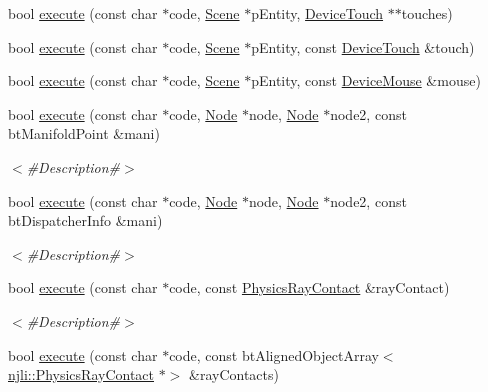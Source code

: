 \begin{DoxyCompactItemize}
\item 
bool \mbox{\hyperlink{classnjli_1_1_world_lua_virtual_machine_aae3f6a29e70b136722d01b316220bee8}{execute}} (const char $\ast$code, \mbox{\hyperlink{classnjli_1_1_scene}{Scene}} $\ast$p\+Entity, \mbox{\hyperlink{classnjli_1_1_device_touch}{Device\+Touch}} $\ast$$\ast$touches)
\item 
bool \mbox{\hyperlink{classnjli_1_1_world_lua_virtual_machine_a2ea566a1d2d4ad3c6b817e5e2d408b8f}{execute}} (const char $\ast$code, \mbox{\hyperlink{classnjli_1_1_scene}{Scene}} $\ast$p\+Entity, const \mbox{\hyperlink{classnjli_1_1_device_touch}{Device\+Touch}} \&touch)
\item 
bool \mbox{\hyperlink{classnjli_1_1_world_lua_virtual_machine_a30f05b73d451fc58e5e64263a4de58f7}{execute}} (const char $\ast$code, \mbox{\hyperlink{classnjli_1_1_scene}{Scene}} $\ast$p\+Entity, const \mbox{\hyperlink{classnjli_1_1_device_mouse}{Device\+Mouse}} \&mouse)
\item 
bool \mbox{\hyperlink{classnjli_1_1_world_lua_virtual_machine_a21227c3230633061ac2cc99a05c41e4e}{execute}} (const char $\ast$code, \mbox{\hyperlink{classnjli_1_1_node}{Node}} $\ast$node, \mbox{\hyperlink{classnjli_1_1_node}{Node}} $\ast$node2, const bt\+Manifold\+Point \&mani)
\begin{DoxyCompactList}\small\item\em $<$\#\+Description\#$>$ \end{DoxyCompactList}\item 
bool \mbox{\hyperlink{classnjli_1_1_world_lua_virtual_machine_a2b0155a6ae5dc65eea24fef0bac79821}{execute}} (const char $\ast$code, \mbox{\hyperlink{classnjli_1_1_node}{Node}} $\ast$node, \mbox{\hyperlink{classnjli_1_1_node}{Node}} $\ast$node2, const bt\+Dispatcher\+Info \&mani)
\begin{DoxyCompactList}\small\item\em $<$\#\+Description\#$>$ \end{DoxyCompactList}\item 
bool \mbox{\hyperlink{classnjli_1_1_world_lua_virtual_machine_a0c9cac6960558de8c59c03f331c00afc}{execute}} (const char $\ast$code, const \mbox{\hyperlink{classnjli_1_1_physics_ray_contact}{Physics\+Ray\+Contact}} \&ray\+Contact)
\begin{DoxyCompactList}\small\item\em $<$\#\+Description\#$>$ \end{DoxyCompactList}\item 
bool \mbox{\hyperlink{classnjli_1_1_world_lua_virtual_machine_af58e380cbfb31f9b0628dacbd528a10f}{execute}} (const char $\ast$code, const bt\+Aligned\+Object\+Array$<$ \mbox{\hyperlink{classnjli_1_1_physics_ray_contact}{njli\+::\+Physics\+Ray\+Contact}} $\ast$$>$ \&ray\+Contacts)

\end{DoxyCompactItemize}
